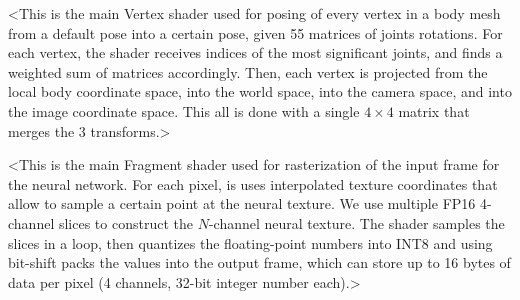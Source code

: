 <This is the main Vertex shader used for posing of every vertex in a body mesh from a default pose into a certain pose, given 55 matrices of joints rotations. For each vertex, the shader receives indices of the most significant joints, and finds a weighted sum of matrices accordingly. Then, each vertex is projected from the local body coordinate space, into the world space, into the camera space, and into the image coordinate space. This all is done with a single $4\times4$ matrix that merges the 3 transforms.>

<This is the main Fragment shader used for rasterization of the input frame for the neural network. For each pixel, is uses interpolated texture coordinates that allow to sample a certain point at the neural texture. We use multiple FP16 4-channel slices to construct the $N$-channel neural texture. The shader samples the slices in a loop, then quantizes the floating-point numbers into INT8 and using bit-shift packs the values into the output frame, which can store up to 16 bytes of data per pixel (4 channels, 32-bit integer number each).>

\clearpage
\newpage
